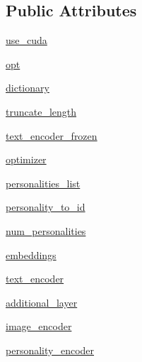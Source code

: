 \subsection*{Public Attributes}
\begin{DoxyCompactItemize}
\item 
\hyperlink{classtransresnet_1_1modules_1_1TransresnetModel_a16d44027020d2029b30bde80b86b9985}{use\+\_\+cuda}
\item 
\hyperlink{classtransresnet_1_1modules_1_1TransresnetModel_a21d64d399d42b5d8f275b93a7ef3f5db}{opt}
\item 
\hyperlink{classtransresnet_1_1modules_1_1TransresnetModel_a9755441a27672c7126eea150daaee0c1}{dictionary}
\item 
\hyperlink{classtransresnet_1_1modules_1_1TransresnetModel_adb1828371e851d80247142fdbfe9ec6a}{truncate\+\_\+length}
\item 
\hyperlink{classtransresnet_1_1modules_1_1TransresnetModel_ac5cca78fec98a84dd761d68782902c2c}{text\+\_\+encoder\+\_\+frozen}
\item 
\hyperlink{classtransresnet_1_1modules_1_1TransresnetModel_a6094f5e2576bb4b018f06afdb0a5ab25}{optimizer}
\item 
\hyperlink{classtransresnet_1_1modules_1_1TransresnetModel_a39b68fff51a01dd00581b553ee37eb50}{personalities\+\_\+list}
\item 
\hyperlink{classtransresnet_1_1modules_1_1TransresnetModel_a2449ec2c088462e64ba02714291b324b}{personality\+\_\+to\+\_\+id}
\item 
\hyperlink{classtransresnet_1_1modules_1_1TransresnetModel_a6d5bdf29c9be08754bce63a7f03d8bc9}{num\+\_\+personalities}
\item 
\hyperlink{classtransresnet_1_1modules_1_1TransresnetModel_ac423b03e2d7c2e0e845e922ba6be8d2b}{embeddings}
\item 
\hyperlink{classtransresnet_1_1modules_1_1TransresnetModel_ae2185f04a629b71ceebc00db1cadee6b}{text\+\_\+encoder}
\item 
\hyperlink{classtransresnet_1_1modules_1_1TransresnetModel_a42cc931560cfffa5765b6f3327f1003e}{additional\+\_\+layer}
\item 
\hyperlink{classtransresnet_1_1modules_1_1TransresnetModel_a37b2604569a59d4e583cfb9d1967fc66}{image\+\_\+encoder}
\item 
\hyperlink{classtransresnet_1_1modules_1_1TransresnetModel_acb657ad36ea30840ecec314dd011132a}{personality\+\_\+encoder}
\end{DoxyCompactItemize}


